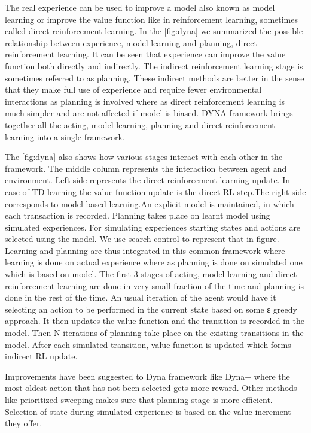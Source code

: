 \documentclass[MTech]{iitmdiss}
\begin{document}
 
The real experience can be used to improve a model also known as model learning or improve the value function like in reinforcement learning, sometimes called direct reinforcement learning. In the \ref{fig:dyna} we summarized the possible relationship between experience, model learning and planning, direct reinforcement learning. It can be seen that experience can improve the value function both directly and indirectly. The indirect reinforcement learning stage is sometimes referred to as planning. These indirect methods are better in the sense that they make full use of experience and require fewer environmental interactions as planning is involved where as direct reinforcement learning is much simpler and are not affected if model is biased. DYNA framework brings together all the acting, model learning, planning and direct reinforcement learning into a single framework.

The \ref{fig:dyna} also shows how various stages interact with each other in the framework. The middle column represents the interaction between agent and environment. Left side represents the direct reinforcement learning update. In case of TD learning the value function update is the direct RL step.The right side corresponds to model based learning.An explicit model is maintained, in which each transaction is recorded. Planning takes place on learnt model using simulated experiences. For simulating experiences starting states and actions are selected using the model. We use search control to represent that in figure. Learning and planning are thus integrated in this common framework where learning is done on actual experience where as planning is done on simulated one which is based on model. The first 3 stages of acting, model learning and direct reinforcement learning are done in very small fraction of the time and planning is done in the rest of the time. An usual iteration of the agent would have it selecting an action to be performed in the current state based on some ε greedy approach. It then updates the value function and the transition is recorded in the model. Then N-iterations of planning take place on the existing transitions in the model. After each simulated transition, value function is updated which forms indirect RL update.

Improvements have been suggested to Dyna framework like Dyna+ where the most oldest action that has not been selected gets more reward. Other methods like prioritized sweeping makes sure that planning stage is more efficient. Selection of state during simulated experience is based on the value increment they offer.
\end{document}
